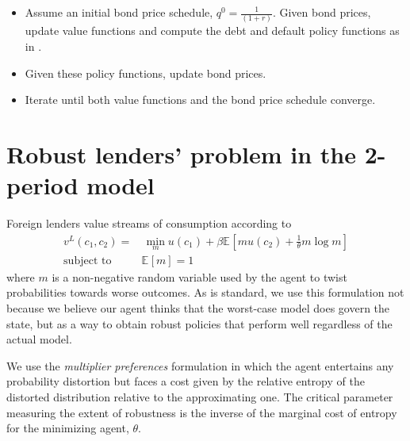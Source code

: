 \documentclass[letterpaper,12pt]{article}
\newcommand{\ex}[2][{}]{\mathbb{E}_{#1}\left[ #2 \right]}
\begin{document}
\begin{itemize}

\item Assume an initial bond price schedule, $q^0 = \frac{1}{(1+r)}$. Given bond prices, update value functions and compute the debt and default policy functions as in \cite{Chatty}.
\item Given these policy functions, update bond prices.
\item Iterate until both value functions and the bond price schedule converge.

\end{itemize}

\section{Robust lenders' problem in the 2-period model}\label{app:lenders}

Foreign lenders value streams of consumption according to
\begin{align*}
  v^L(c_1, c_2) = &\,\min_m u(c_1) + \beta \ex{m u(c_2) + \frac{1}{\theta} m \log m} \\
  \text{subject to } \,
  & \ex{m} = 1
\end{align*}
where $m$ is a non-negative random variable used by the agent to twist probabilities towards worse outcomes. As is standard, we use this formulation not because we believe our agent thinks that the worst-case model does govern the state, but as a way to obtain robust policies that perform well regardless of the actual model.

We use the \emph{multiplier preferences} formulation in which the agent entertains any probability distortion but faces a cost given by the relative entropy of the distorted distribution relative to the approximating one. The critical parameter measuring the extent of robustness is the inverse of the marginal cost of entropy for the minimizing agent, $\theta$.
\end{document}
